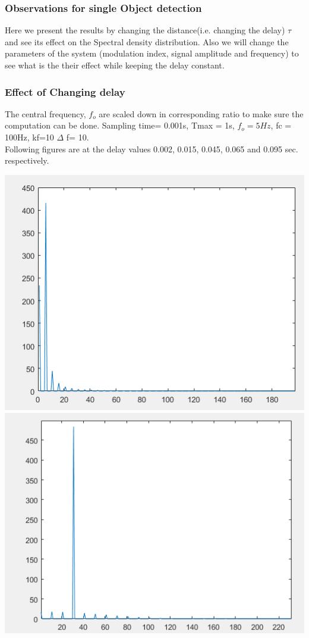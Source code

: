 \documentclass[12pt]{article}
\begin{document}
\subsubsection*{Observations for single Object detection}
\begin{flushleft}
Here we present the results by changing the distance(i.e. changing the delay) $\tau$ and see its effect on the Spectral density distribution. Also we will change the parameters of the system (modulation index, signal amplitude and frequency) to see what is the their effect while keeping the delay constant.
\subsubsection*{Effect of Changing delay}
The central frequency, $f_o$ are scaled down in corresponding ratio to make sure the computation can be done. Sampling time= 0.001s, Tmax = 1s, $f_o = 5Hz$,  fc = 100Hz, kf=10 $\Delta$ f= 10. \\
Following figures are at the delay values 0.002, 0.015, 0.045, 0.065 and 0.095 sec. respectively.
\begin{center}
    \includegraphics[scale = 0.75]{_002.PNG}\\[1.0 cm]
    \includegraphics[scale = 0.75]{_015.PNG}\\[1.0 cm]

\end{center}
\end{flushleft}
\end{document}
